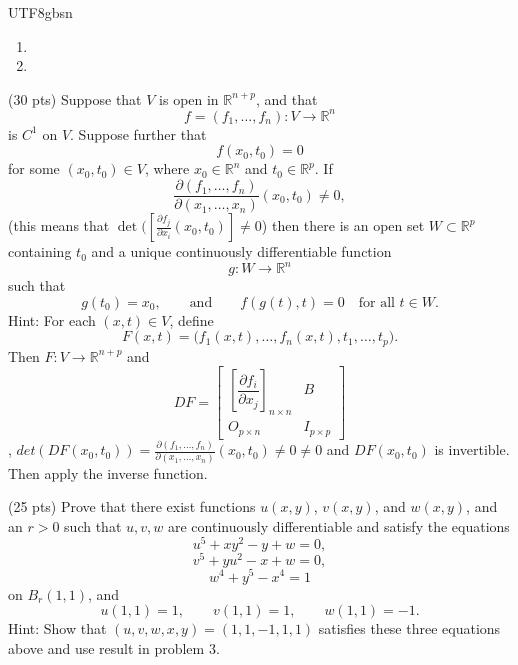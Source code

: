 \documentclass[addpoints]{exam}
\theoremstyle{definition}
\begin{document}
\begin{CJK*}{UTF8}{gbsn}
\begin{questions}
\begin{solution}

\begin{enumerate}
\item[(a)] 



\bigskip
\item[(b)] 




\end{enumerate} 
\end{solution}

\question (30 pts) 
Suppose that \(V\) is open in \(\mathbb{R}^{n+p}\), and that
\[
f=(f_1,\dots,f_n):V\to\mathbb{R}^n
\]
is \(C^1\) on \(V\). Suppose further that
\[
f(x_0,t_0)=0
\]
for some \((x_0,t_0)\in V\), where \(x_0\in\mathbb{R}^n\) and \(t_0\in\mathbb{R}^p\). If
\[
\frac{\partial(f_1,\dots,f_n)}{\partial(x_1,\dots,x_n)}(x_0,t_0)\neq 0,
\] (this means that $\det( [\frac{\partial f_j}{\partial x_i} (x_0,t_0) ]\neq 0$)
then there is an open set \(W\subset\mathbb{R}^p\) containing \(t_0\) and a unique continuously differentiable function
\[
g:W\to\mathbb{R}^n
\]
such that
\[
g(t_0)=x_0,
\qquad\text{and}\qquad
f(g(t),t)=0
\quad\text{for all } t\in W.
\]
Hint: For each \((x,t)\in V\), define
\[
F(x,t)=\bigl(f_1(x,t),\dots,f_n(x,t),t_1,\dots,t_p\bigr).
\]
Then \( F:V\to\mathbb{R}^{n+p}\) and
\[
D F=
\begin{bmatrix}
\left[\dfrac{\partial f_i}{\partial x_j}\right]_{n\times n} & B\\[1ex]
O_{p\times n} & I_{p\times p}
\end{bmatrix}
\], $det(D F (x_0,t_0))= \frac{\partial(f_1,\dots,f_n)}{\partial(x_1,\dots,x_n)}(x_0,t_0)\neq 0 \neq 0$ and $D F (x_0,t_0)$ is invertible. Then apply the inverse function.
\begin{solution} 
 
 \end{solution}

\question (25 pts) Prove that there exist functions \(u(x,y)\), \(v(x,y)\), and \(w(x,y)\), and an
\(r>0\) such that \(u,v,w\) are continuously differentiable and satisfy the
equations
\[
u^5+xy^2-y+w=0,
\]
\[
v^5+yu^2-x+w=0,
\]
\[
w^4+y^5-x^4=1
\]
on \(B_r(1,1)\), and
\[
u(1,1)=1,\qquad v(1,1)=1,\qquad w(1,1)=-1.
\] Hint: Show that $(u,v,w,x,y)= (1,1,-1,1,1)$ satisfies these three equations above and use result in problem 3. 
\begin{solution} 

\end{solution}



\end{questions}
\end{CJK*}
\end{document}
